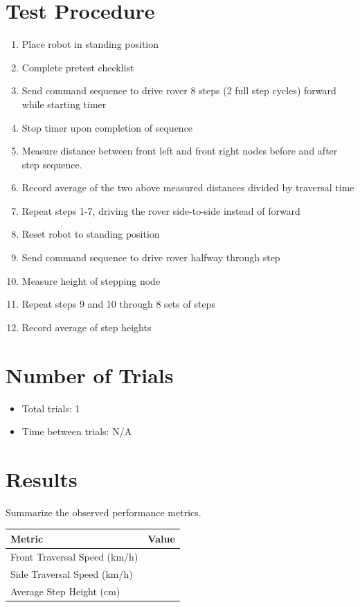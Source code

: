 \documentclass[11pt]{article}
\begin{document}
\section*{Test Procedure}
\begin{enumerate}[noitemsep]
    \item Place robot in standing position
    \item Complete pretest checklist
    \item Send command sequence to drive rover 8 steps (2 full step cycles) forward while starting timer
    \item Stop timer upon completion of sequence
    \item Measure distance between front left and front right nodes before and after step sequence.
    \item Record average of the two above measured distances divided by traversal time
    \item Repeat steps 1-7, driving the rover side-to-side instead of forward
    \item Reset robot to standing position
    \item Send command sequence to drive rover halfway through step
    \item Measure height of stepping node
    \item Repeat steps 9 and 10 through 8 sets of steps
    \item Record average of step heights

\end{enumerate}

\section*{Number of Trials}
\begin{itemize}[noitemsep]
    \item Total trials: 1
    \item Time between trials: N/A
\end{itemize}

\section*{Results}
Summarize the observed performance metrics.

\begin{center}
\begin{tabular}{lc}
\toprule
Metric & Value\\
\midrule
Front Traversal Speed (km/h)&  \\
 Side Traversal Speed (km/h)&\\
 Average Step Height (cm)&\\
\end{tabular}
\end{center}
\end{document}
